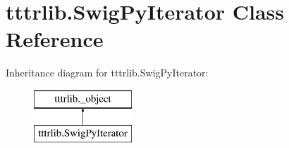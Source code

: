 \hypertarget{classtttrlib_1_1_swig_py_iterator}{}\section{tttrlib.\+Swig\+Py\+Iterator Class Reference}
\label{classtttrlib_1_1_swig_py_iterator}
Inheritance diagram for tttrlib.\+Swig\+Py\+Iterator\+:\begin{figure}[H]
\begin{center}
\leavevmode
\includegraphics[height=2.000000cm]{classtttrlib_1_1_swig_py_iterator}
\end{center}
\end{figure}

